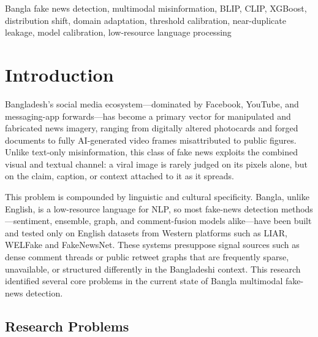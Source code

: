 \documentclass[conference,a4paper]{IEEEtran}
\begin{document}
\begin{IEEEkeywords}
Bangla fake news detection, multimodal misinformation, BLIP, CLIP, XGBoost,
distribution shift, domain adaptation, threshold calibration, near-duplicate
leakage, model calibration, low-resource language processing
\end{IEEEkeywords}

\section{Introduction}

Bangladesh's social media ecosystem---dominated by Facebook, YouTube, and
messaging-app forwards---has become a primary vector for manipulated and
fabricated news imagery, ranging from digitally altered photocards and forged
documents to fully AI-generated video frames misattributed to public figures.
Unlike text-only misinformation, this class of fake news exploits the combined
visual and textual channel: a viral image is rarely judged on its pixels
alone, but on the claim, caption, or context attached to it as it spreads.

This problem is compounded by linguistic and cultural specificity. Bangla,
unlike English, is a low-resource language for NLP, so most fake-news
detection methods---sentiment, ensemble, graph, and comment-fusion models
alike---have been built and tested only on English datasets from Western
platforms such as LIAR, WELFake and FakeNewsNet. These systems presuppose
signal sources such as dense comment threads or public retweet graphs that are
frequently sparse, unavailable, or structured differently in the Bangladeshi
context. This research identified several core problems in the current state
of Bangla multimodal fake-news detection.

\subsection{Research Problems}
\end{document}
